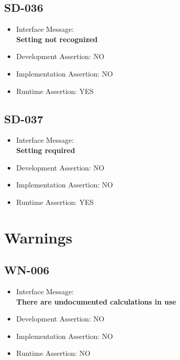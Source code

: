 \subsection{SD-036}
\begin{itemize}
  \item Interface Message:\\[1em]
    \textbf{Setting not recognized}
  \item Development Assertion: NO
  \item Implementation Assertion: NO
  \item Runtime Assertion: YES
\end{itemize}

\subsection{SD-037}
\begin{itemize}
  \item Interface Message:\\[1em]
    \textbf{Setting required}
  \item Development Assertion: NO
  \item Implementation Assertion: NO
  \item Runtime Assertion: YES
\end{itemize}

\section{Warnings}

\subsection{WN-006}
\begin{itemize}
  \item Interface Message:\\[1em]
    \textbf{There are undocumented calculations in use}
  \item Development Assertion: NO
  \item Implementation Assertion: NO
  \item Runtime Assertion: NO
\end{itemize}

